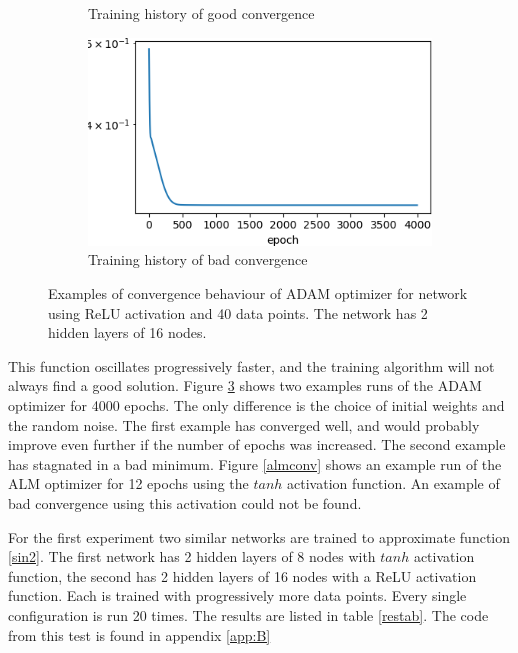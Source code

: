 \begin{figure}
\begin{subfigure}[b]{0.49\textwidth}
         \caption{Training history of good convergence}
         \label{adamgoodconv}
     \end{subfigure}
     \begin{subfigure}[b]{0.49\textwidth}
         \centering
         \includegraphics[width=\textwidth]{adambadconv}
         \caption{Training history of bad convergence}
         \label{adambadconv}
     \end{subfigure}
    \caption{Examples of convergence behaviour of ADAM optimizer for network using ReLU activation and 40 data points. The network has 2 hidden layers of 16 nodes.}
    \label{adamconv}
\end{figure}

This function oscillates progressively faster, and the training algorithm will not always find a good solution. Figure \ref{adamconv} shows two examples runs of the ADAM optimizer for 4000 epochs. The only difference is the choice of initial weights and the random noise. The first example has converged well, and would probably improve even further if the number of epochs was increased. The second example has stagnated in a bad minimum. Figure \ref{almconv} shows an example run of the ALM optimizer for 12 epochs using the $tanh$ activation function. An example of bad convergence using this activation could not be found.

For the first experiment two similar networks are trained to approximate function \ref{sin2}. The first network has 2 hidden layers of 8 nodes with $tanh$ activation function, the second has 2 hidden layers of 16 nodes with a ReLU activation function. Each is trained with progressively more data points. Every single configuration is run 20 times. The results are listed in table \ref{restab}. The code from this test is found in appendix \ref{app:B}

